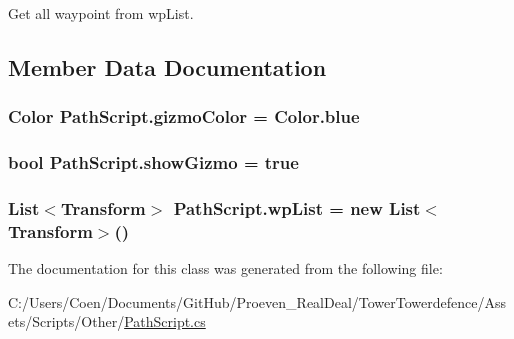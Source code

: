 Get all waypoint from wp\+List. 



\subsection{Member Data Documentation}
\subsubsection[{\texorpdfstring{gizmo\+Color}{gizmoColor}}]{\setlength{\rightskip}{0pt plus 5cm}Color Path\+Script.\+gizmo\+Color = Color.\+blue}\hypertarget{class_path_script_a869d70d31896752f0450858dc87354b1}{}\label{class_path_script_a869d70d31896752f0450858dc87354b1}
\subsubsection[{\texorpdfstring{show\+Gizmo}{showGizmo}}]{\setlength{\rightskip}{0pt plus 5cm}bool Path\+Script.\+show\+Gizmo = true}\hypertarget{class_path_script_a4f0aab595bf88d223da1b44d462cc666}{}\label{class_path_script_a4f0aab595bf88d223da1b44d462cc666}
\subsubsection[{\texorpdfstring{wp\+List}{wpList}}]{\setlength{\rightskip}{0pt plus 5cm}List$<$Transform$>$ Path\+Script.\+wp\+List = new List$<$Transform$>$()}\hypertarget{class_path_script_a20f0d851ef5b468cc246f6af8097a238}{}\label{class_path_script_a20f0d851ef5b468cc246f6af8097a238}


The documentation for this class was generated from the following file\+:\begin{DoxyCompactItemize}
\item 
C\+:/\+Users/\+Coen/\+Documents/\+Git\+Hub/\+Proeven\+\_\+\+Real\+Deal/\+Tower\+Towerdefence/\+Assets/\+Scripts/\+Other/\hyperlink{_path_script_8cs}{Path\+Script.\+cs}\end{DoxyCompactItemize}
